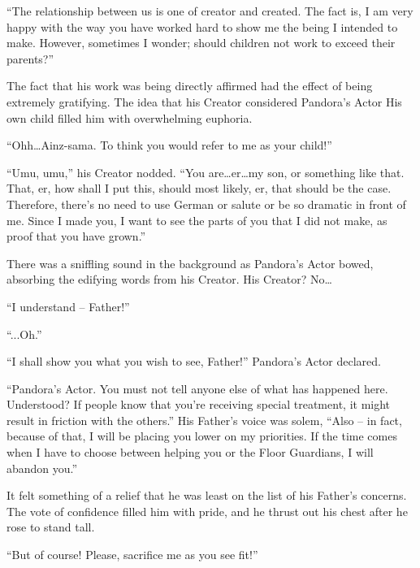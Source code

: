 “The relationship between us is one of creator and created. The fact is, I am very happy with the way you have worked hard to show me the being I intended to make. However, sometimes I wonder; should children not work to exceed their parents?”

 

The fact that his work was being directly affirmed had the effect of being extremely gratifying. The idea that his Creator considered Pandora’s Actor His own child filled him with overwhelming euphoria.

 

“Ohh…Ainz-sama. To think you would refer to me as your child!”

 

“Umu, umu,” his Creator nodded. “You are…er…my son, or something like that. That, er, how shall I put this, should most likely, er, that should be the case. Therefore, there’s no need to use German or salute or be so dramatic in front of me. Since I made you, I want to see the parts of you that I did not make, as proof that you have grown.”

 

There was a sniffling sound in the background as Pandora’s Actor bowed, absorbing the edifying words from his Creator. His Creator? No…

 

“I understand – Father!”

 

“...Oh.”

 

“I shall show you what you wish to see, Father!” Pandora’s Actor declared.

 

“Pandora’s Actor. You must not tell anyone else of what has happened here. Understood? If people know that you’re receiving special treatment, it might result in friction with the others.” His Father’s voice was solem, “Also – in fact, because of that, I will be placing you lower on my priorities. If the time comes when I have to choose between helping you or the Floor Guardians, I will abandon you.”

 

It felt something of a relief that he was least on the list of his Father’s concerns. The vote of confidence filled him with pride, and he thrust out his chest after he rose to stand tall.

 

“But of course! Please, sacrifice me as you see fit!”

